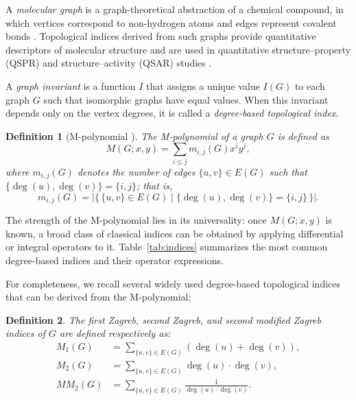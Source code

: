\documentclass[letterpaper,12pt]{article}
\newtheorem{definition}{Definition}
\begin{document}
A \emph{molecular graph} is a graph-theoretical abstraction of a chemical compound, in which vertices correspond to non-hydrogen atoms and edges represent covalent bonds \cite{gutman2012mathematical}.  
Topological indices derived from such graphs provide quantitative descriptors of molecular structure and are used in quantitative structure–property (QSPR) and structure–activity (QSAR) studies \cite{Dearden2017}.


A \emph{graph invariant} is a function \(I\) that assigns a unique value \(I(G)\) to each graph \(G\) such that isomorphic graphs have equal values.  
When this invariant depends only on the vertex degrees, it is called a \emph{degree-based topological index}.

\begin{definition}[M-polynomial {\cite{EmericMploy}}]
The \emph{M-polynomial} of a graph \(G\) is defined as
\begin{equation}
M(G; x, y)
 = \sum_{i \le j} m_{i,j}(G) x^i y^j,
\end{equation}
where \(m_{i,j}(G)\) denotes the number of edges \(\{u,v\} \in E(G)\) such that
\(\{\deg(u), \deg(v)\} = \{i,j\}\); that is,
\[
m_{i,j}(G)
= \big| \{\, \{u,v\} \in E(G) \mid \{\deg(u),\deg(v)\} = \{i,j\} \,\} \big|.
\]
\end{definition}
The strength of the M-polynomial lies in its universality: once \(M(G; x,y)\) is known,  
a broad class of classical indices can be obtained by applying differential or integral operators to it.  
Table~\ref{tab:indices} summarizes the most common degree-based indices and their operator expressions.





 

For completeness, we recall several widely used degree-based topological indices  that can be derived from the M-polynomial:

\begin{definition}
The \emph{first Zagreb}, \emph{second Zagreb}, and \emph{second modified Zagreb} indices of $G$ are defined respectively as:
\begin{align}
    M_1(G) &= \sum_{\{u,v\} \in E(G)} \left(\deg(u) + \deg(v)\right), \\
    M_2(G) &= \sum_{\{u,v\} \in E(G)} \deg(u) \cdot \deg(v), \\
    MM_2(G) &= \sum_{\{u,v\} \in E(G)} \frac{1}{\deg(u) \cdot \deg(v)}.
\end{align}
\end{definition}
\end{document}
